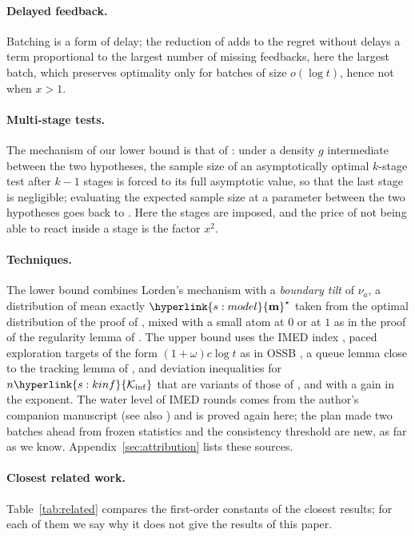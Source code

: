 \documentclass[10pt]{article}
\newcommand{\sy}[2]{{\hyperlink{#1}{#2}}}
\newcommand{\1}{\mathbf{1}}
\newcommand{\m}{\sy{s:model}{\mathbf{m}}}
\newcommand{\Ki}{\sy{s:kinf}{\mathcal K_{\inf}}}
\begin{document}
\paragraph{Delayed feedback.} Batching is a form of delay; the reduction of \citet[Theorem~6]{JGS13} adds to the regret without delays a term proportional to
the largest number of missing feedbacks, here the largest batch, which preserves optimality only for batches of size $o(\log t)$, hence not when $x>1$.

\paragraph{Multi-stage tests.} The mechanism of our lower bound is that of \citet[Theorem~3 and its proof]{L83}: under a density $g$ intermediate between the two
hypotheses, the sample size of an asymptotically optimal $k$-stage test after $k-1$ stages is forced to its full asymptotic value, so that the last stage is negligible;
evaluating the expected sample size at a parameter between the two hypotheses goes back to \citet{H60}. Here the stages are imposed, and the price of not being
able to react inside a stage is the factor $x^2$.

\paragraph{Techniques.} The lower bound combines Lorden's mechanism with a \emph{boundary tilt} of $\nu_a$, a distribution of mean exactly $\m^\star$ taken from the
optimal distribution of the proof of \citet[Theorem~8]{HT10}, mixed with a small atom at $0$ or at $1$ as in the proof of the regularity lemma of
\citet[Appendix~B.1]{GHMS22}. The upper bound uses the IMED index \citep[Section~2, Algorithm~1]{HT15}, paced exploration targets of the form $(1+\omega)c\log t$ as in
OSSB \citep[Section~5, Algorithm~1]{CMP17}, a queue lemma close to the tracking lemma of \citet[Appendix~B.1, Lemma~15]{GK16}, and deviation inequalities for $n\Ki$ that
are variants of those of \citet{CGMMS13}, \citet{HT15} and \citet{GHMS22} with a gain in the exponent. The water level of IMED rounds comes from the author's companion manuscript (see also
\citealp{P26}) and is proved again here; the plan made two batches ahead from frozen statistics and the consistency threshold are new, as far as we know.
Appendix~\ref{sec:attribution} lists these sources.

\paragraph{Closest related work.}\label{sec:closest} Table~\ref{tab:related} compares the first-order constants of the closest results; for each of them we say why it does not give
the results of this paper.
\end{document}
